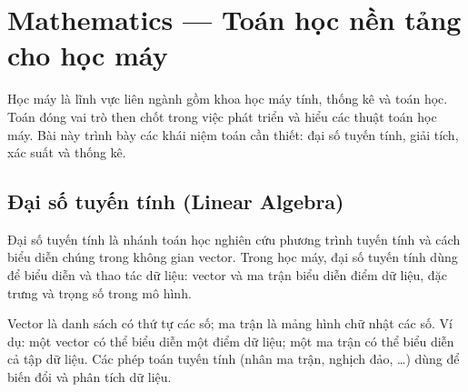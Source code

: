 \section{Mathematics --- Toán học nền tảng cho học máy}
\label{sec:toan-nen-ml}

\begin{dongco}[title={Vai trò của toán trong ML}]
Học máy là lĩnh vực liên ngành gồm khoa học máy tính, thống kê và toán học.
Toán đóng vai trò then chốt trong việc phát triển và hiểu các thuật toán học máy.
Bài này trình bày các khái niệm toán cần thiết: đại số tuyến tính, giải tích, xác suất và thống kê.
\end{dongco}

\subsection{Đại số tuyến tính (Linear Algebra)}

\begin{dinhnghia}[title={Đại số tuyến tính}]
Đại số tuyến tính là nhánh toán học nghiên cứu phương trình tuyến tính và cách biểu diễn chúng trong không gian vector.
Trong học máy, đại số tuyến tính dùng để biểu diễn và thao tác dữ liệu: vector và ma trận biểu diễn điểm dữ liệu, đặc trưng và trọng số trong mô hình.
\end{dinhnghia}

\begin{ynghia}[title={Vector và ma trận}]
Vector là danh sách có thứ tự các số; ma trận là mảng hình chữ nhật các số.
Ví dụ: một vector có thể biểu diễn một điểm dữ liệu; một ma trận có thể biểu diễn cả tập dữ liệu.
Các phép toán tuyến tính (nhân ma trận, nghịch đảo, \ldots) dùng để biến đổi và phân tích dữ liệu.
\end{ynghia}

